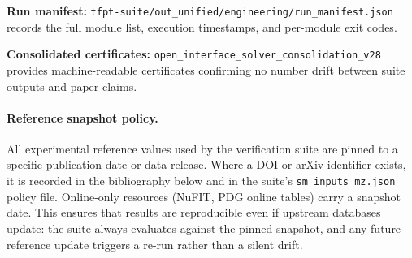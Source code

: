 \textbf{Run manifest:} \texttt{tfpt-suite/out\_unified/engineering/run\_manifest.json} records the full module list, execution timestamps, and per-module exit codes.

\textbf{Consolidated certificates:} \texttt{open\_interface\_solver\_consolidation\_v28} provides machine-readable certificates confirming no number drift between suite outputs and paper claims.

\paragraph{Reference snapshot policy.}
All experimental reference values used by the verification suite are pinned to a specific
publication date or data release.  Where a DOI or arXiv identifier exists, it is recorded
in the bibliography below and in the suite's \texttt{sm\_inputs\_mz.json} policy file.
Online-only resources (NuFIT, PDG online tables) carry a snapshot date.
This ensures that results are reproducible even if upstream databases update:
the suite always evaluates against the pinned snapshot, and any future reference update
triggers a re-run rather than a silent drift.


